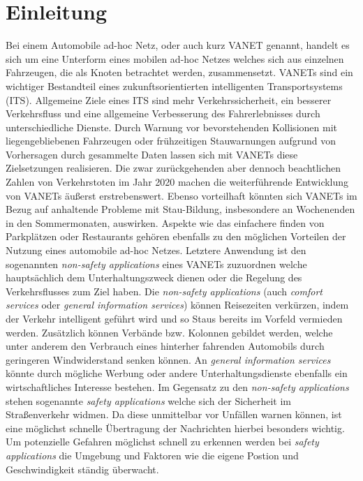 \documentclass[english,runningheads,a4paper]{llncs}[2018/03/10]
\begin{document}
\section{Einleitung}\label{sec:intro}
Bei einem Automobile ad-hoc Netz, oder auch kurz VANET genannt, handelt es sich um eine Unterform eines mobilen ad-hoc Netzes welches sich aus einzelnen Fahrzeugen, die als Knoten betrachtet werden, zusammensetzt.
VANETs sind ein wichtiger Bestandteil eines zukunftsorientierten intelligenten Transportsystems (ITS).
Allgemeine Ziele eines ITS sind mehr Verkehrssicherheit, ein besserer Verkehrsfluss und eine allgemeine Verbesserung des Fahrerlebnisses durch unterschiedliche Dienste.
Durch Warnung vor bevorstehenden Kollisionen mit liegengebliebenen Fahrzeugen oder frühzeitigen Stauwarnungen aufgrund von Vorhersagen durch gesammelte Daten lassen sich mit VANETs diese Zielsetzungen realisieren.
Die zwar zurückgehenden aber dennoch beachtlichen Zahlen von Verkehrstoten im Jahr 2020\cite{adacVerkehrstote} machen die weiterführende Entwicklung von VANETs äußerst erstrebenswert.
Ebenso vorteilhaft könnten sich VANETs im Bezug auf anhaltende Probleme mit Stau-Bildung, insbesondere an Wochenenden in den Sommermonaten\cite{adacStaus}, auswirken.
Aspekte wie das einfachere finden von Parkplätzen oder Restaurants gehören ebenfalls zu den möglichen Vorteilen der Nutzung eines automobile ad-hoc Netzes.
Letztere Anwendung ist den sogenannten \textit{non-safety applications} eines VANETs zuzuordnen welche hauptsächlich dem Unterhaltungszweck dienen oder die Regelung des Verkehrsflusses zum Ziel haben.
Die \textit{non-safety applications} (auch \textit{comfort services} oder \textit{general information services}) können Reisezeiten verkürzen, indem der Verkehr intelligent geführt wird und so Staus bereits im Vorfeld vermieden werden.
Zusätzlich können Verbände bzw. Kolonnen gebildet werden, welche unter anderem den Verbrauch eines hinterher fahrenden Automobils durch geringeren Windwiderstand senken können.
An \textit{general information services} könnte durch mögliche Werbung oder andere Unterhaltungsdienste ebenfalls ein wirtschaftliches Interesse bestehen.
Im Gegensatz zu den \textit{non-safety applications} stehen sogenannte \textit{safety applications} welche sich der Sicherheit im Straßenverkehr widmen.
Da diese unmittelbar vor Unfällen warnen können, ist eine möglichst schnelle Übertragung der Nachrichten hierbei besonders wichtig.
Um potenzielle Gefahren möglichst schnell zu erkennen werden bei \textit{safety applications} die Umgebung und Faktoren wie die eigene Postion und Geschwindigkeit ständig überwacht.
\end{document}
